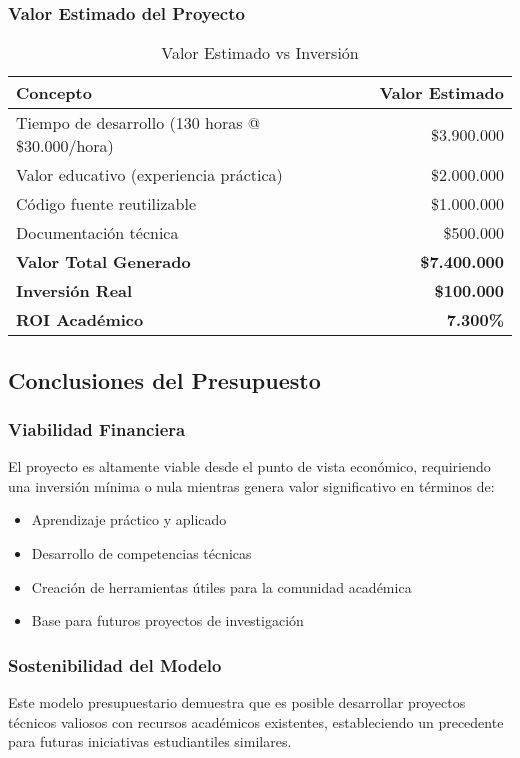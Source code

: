 \subsubsection{Valor Estimado del Proyecto}

\begin{table}[H]
    \centering
    \small
    \begin{tabular}{|l|r|}
        \hline
        \textbf{Concepto} & \textbf{Valor Estimado} \\
        \hline
        Tiempo de desarrollo (130 horas @ \$30.000/hora) & \$3.900.000 \\
        \hline
        Valor educativo (experiencia práctica) & \$2.000.000 \\
        \hline
        Código fuente reutilizable & \$1.000.000 \\
        \hline
        Documentación técnica & \$500.000 \\
        \hline
        \textbf{Valor Total Generado} & \textbf{\$7.400.000} \\
        \hline
        \textbf{Inversión Real} & \textbf{\$100.000} \\
        \hline
        \textbf{ROI Académico} & \textbf{7.300\%} \\
        \hline
    \end{tabular}
    \caption{Valor Estimado vs Inversión}
    \label{tab:valor_proyecto}
\end{table}

\subsection{Conclusiones del Presupuesto}

\subsubsection{Viabilidad Financiera}
El proyecto es altamente viable desde el punto de vista económico, requiriendo una inversión mínima o nula mientras genera valor significativo en términos de:

\begin{itemize}
    \item Aprendizaje práctico y aplicado
    \item Desarrollo de competencias técnicas
    \item Creación de herramientas útiles para la comunidad académica
    \item Base para futuros proyectos de investigación
\end{itemize}

\subsubsection{Sostenibilidad del Modelo}
Este modelo presupuestario demuestra que es posible desarrollar proyectos técnicos valiosos con recursos académicos existentes, estableciendo un precedente para futuras iniciativas estudiantiles similares.
